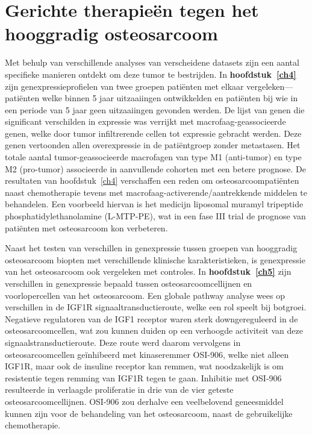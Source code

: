 \section{Gerichte therapie\"en tegen het hooggradig osteosarcoom}\label{gerichte10}
Met behulp van verschillende analyses van verscheidene datasets zijn een aantal specifieke manieren ontdekt om deze tumor te bestrijden. In {\bf hoofdstuk~\ref{ch4}} zijn genexpressieprofielen van twee groepen pati\"enten met elkaar vergeleken---pati\"enten welke binnen 5 jaar uitzaaiingen ontwikkelden en pati\"enten bij wie in een periode van 5 jaar geen uitzaaiingen gevonden werden. De lijst van genen die significant verschilden in expressie was verrijkt met macrofaag\hyp{}geassocieerde genen, welke door tumor infiltrerende cellen tot expressie gebracht werden. Deze genen vertoonden allen overexpressie in de pati\"entgroep zonder metastasen. Het totale aantal tumor\hyp{}geassocieerde macrofagen van type M1 (anti\hyp{}tumor) en type M2 (pro\hyp{}tumor) associeerde in aanvullende cohorten met een betere prognose. De resultaten van hoofdstuk~\ref{ch4} verschaffen een reden om osteosarcoompati\"enten naast chemotherapie tevens met macrofaag\hyp{}activerende/aantrekkende middelen te behandelen. Een voorbeeld hiervan is het medicijn liposomal muramyl tripeptide phosphatidylethanolamine (L-MTP-PE), wat in een fase III trial de prognose van pati\"enten met osteosarcoom kon verbeteren.

Naast het testen van verschillen in genexpressie tussen groepen van hooggradig osteosarcoom biopten met verschillende klinische karakteristieken, is genexpressie van het osteosarcoom ook vergeleken met controles. In {\bf hoofdstuk~\ref{ch5}} zijn verschillen in genexpressie bepaald tussen osteosarcoomcellijnen en voorlopercellen van het osteosarcoom. Een globale pathway analyse wees op verschillen in de IGF1R signaaltransductieroute, welke een rol speelt bij botgroei. Negatieve regulatoren van de IGF1 receptor waren sterk downgereguleerd in de osteosarcoomcellen, wat zou kunnen duiden op een verhoogde activiteit van deze signaalstransductieroute. Deze route werd daarom vervolgens in osteosarcoomcellen ge\"inhibeerd met kinaseremmer OSI-906, welke niet alleen IGF1R, maar ook de insuline receptor kan remmen, wat noodzakelijk is om resistentie tegen remming van IGF1R tegen te gaan. Inhibitie met OSI-906 resulteerde in verlaagde proliferatie in drie van de vier geteste osteosarcoomcellijnen. OSI-906 zou derhalve een veelbelovend geneesmiddel kunnen zijn voor de behandeling van het osteosarcoom, naast de gebruikelijke chemotherapie.


